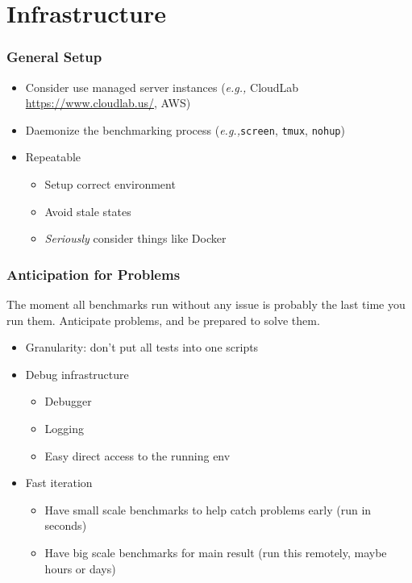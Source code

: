 \documentclass[xcolor={dvipsnames},aspectratio=149]{beamer}
\def\eg{\emph{e.g.,}\xspace}
\begin{document}
\section{Infrastructure}
\begin{frame}
  \frametitle{General Setup}
  \begin{itemize}
  \item Consider use managed server instances (\eg CloudLab \url{https://www.cloudlab.us/}, AWS)
  \item Daemonize the benchmarking process (\eg \texttt{screen}, \texttt{tmux}, \texttt{nohup})
  \item Repeatable
    \begin{itemize}
    \item Setup correct environment
    \item Avoid stale states
    \item \textit{Seriously} consider things like Docker
    \end{itemize}
  \end{itemize}
\end{frame}

\begin{frame}
  \frametitle{Anticipation for Problems}
  The moment all benchmarks run without any issue is probably the last time you run them.
  Anticipate problems, and be prepared to solve them.
  \begin{itemize}
  \item Granularity: don't put all tests into one scripts
  \item Debug infrastructure
    \begin{itemize}
    \item Debugger
    \item Logging
    \item Easy direct access to the running env
    \end{itemize}
  \item Fast iteration
    \begin{itemize}
    \item Have small scale benchmarks to help catch problems early (run in seconds)
    \item Have big scale benchmarks for main result (run this remotely, maybe hours or days)
    \end{itemize}
  \end{itemize}
\end{frame}
\end{document}
